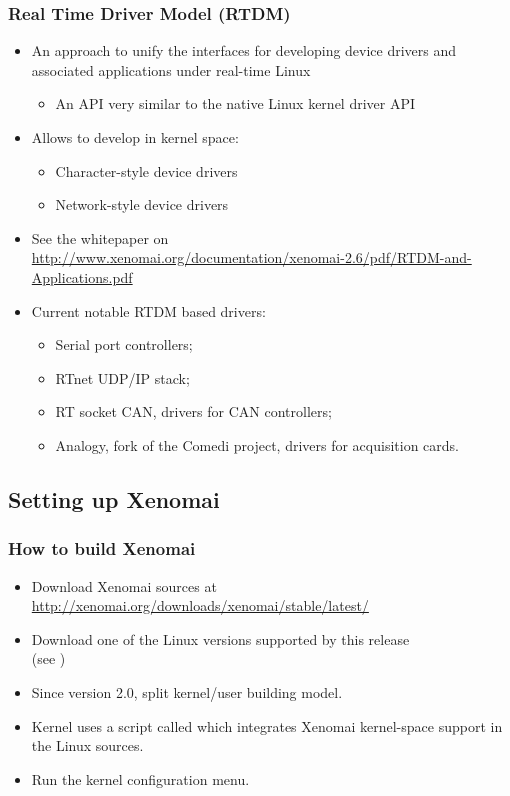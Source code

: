 \begin{frame}
  \frametitle{Real Time Driver Model (RTDM)}
  \begin{itemize}
  \item An approach to unify the interfaces for developing device
    drivers and associated applications under real-time Linux
    \begin{itemize}
    \item An API very similar to the native Linux kernel driver API
    \end{itemize}
  \item Allows to develop in kernel space:
    \begin{itemize}
    \item Character-style device drivers
    \item Network-style device drivers
    \end{itemize}
  \item See the whitepaper on\\
    \url{http://www.xenomai.org/documentation/xenomai-2.6/pdf/RTDM-and-Applications.pdf}
  \item Current notable RTDM based drivers:
    \begin{itemize}
    \item Serial port controllers;
    \item RTnet UDP/IP stack;
    \item RT socket CAN, drivers for CAN controllers;
    \item Analogy, fork of the Comedi project, drivers for acquisition cards.
    \end{itemize}
  \end{itemize}
\end{frame}

\subsection{Setting up Xenomai}

\begin{frame}
  \frametitle{How to build Xenomai}
  \begin{itemize}
  \item Download Xenomai sources at
    \url{http://xenomai.org/downloads/xenomai/stable/latest/}
  \item Download one of the Linux versions supported by this release\\
    (see )
  \item Since version 2.0, split kernel/user building model.
  \item Kernel uses a script called 
    which integrates Xenomai kernel-space support in the Linux
    sources.
  \item Run the kernel configuration menu.
  \end{itemize}
\end{frame}

